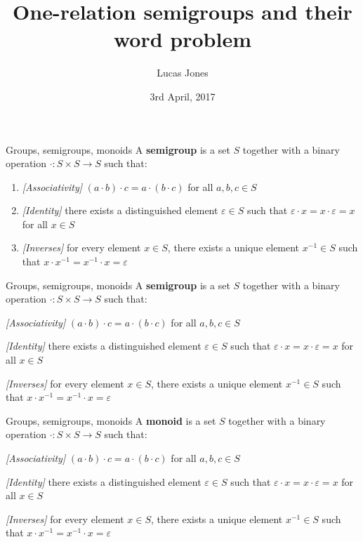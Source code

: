 \documentclass{beamer}
\title{One-relation semigroups and their word problem}
\author{Lucas Jones}
\date{3rd April, 2017}
\institute{University of St Andrews}
\let\epsilon\varepsilon
\begin{document}
\maketitle

\begin{frame}{Groups, semigroups, monoids}
	A \textbf{\textcolor{inactive}{semi}group} is a set $S$ together with a binary operation $\cdot \colon S \times S \to S$ such that:

	\begin{enumerate}
		\item \emph{[Associativity]} $(a \cdot b) \cdot c = a \cdot (b \cdot c)$ for all $a, b, c \in S$
		\item \emph{[Identity]} there exists a distinguished element $\epsilon \in S$ such that $\epsilon \cdot x = x \cdot \epsilon = x$ for all $x \in S$
		\item \emph{[Inverses]} for every element $x \in S$, there exists a unique element $x^{-1} \in S$ such that $x \cdot x^{-1} = x^{-1} \cdot x = \epsilon$
	\end{enumerate}
\end{frame}

\begin{frame}{Groups, semigroups, monoids}
	A \textbf{semigroup} is a set $S$ together with a binary operation $\cdot \colon S \times S \to S$ such that:

	\begin{enumerate}
		\item \emph{[Associativity]} $(a \cdot b) \cdot c = a \cdot (b \cdot c)$ for all $a, b, c \in S$
		\textcolor{inactive}{
		\item \emph{[Identity]} there exists a distinguished element $\epsilon \in S$ such that $\epsilon \cdot x = x \cdot \epsilon = x$ for all $x \in S$
		\item \emph{[Inverses]} for every element $x \in S$, there exists a unique element $x^{-1} \in S$ such that $x \cdot x^{-1} = x^{-1} \cdot x = \epsilon$
			}
	\end{enumerate}
\end{frame}

\begin{frame}{Groups, semigroups, monoids}
	A \textbf{monoid} is a set $S$ together with a binary operation $\cdot \colon S \times S \to S$ such that:

	\begin{enumerate}
		\item \emph{[Associativity]} $(a \cdot b) \cdot c = a \cdot (b \cdot c)$ for all $a, b, c \in S$
		\item \emph{[Identity]} there exists a distinguished element $\epsilon \in S$ such that $\epsilon \cdot x = x \cdot \epsilon = x$ for all $x \in S$
		\textcolor{inactive}{
		\item \emph{[Inverses]} for every element $x \in S$, there exists a unique element $x^{-1} \in S$ such that $x \cdot x^{-1} = x^{-1} \cdot x = \epsilon$
			}
	\end{enumerate}
\end{frame}
\end{document}

